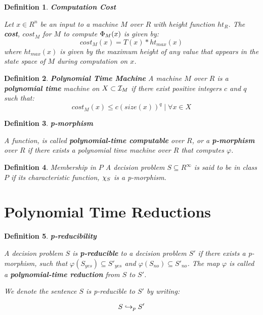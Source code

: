 \documentclass[twoside]{article}
\newtheorem{definition}{Definition}[section]
\begin{document}
\begin{definition}{\textbf{Computation Cost}}
  
  Let $x \in R^n$ be an input to a machine $M$ over $R$ with height
  function $ht_R$. The \textbf{cost}, $cost_M$ for $M$ to
  compute $\Phi_M(x)$ is given by:
  $$cost_M(x) = T(x) * ht_{max}(x)$$ where $ht_{max}(x)$ is given by the maximum
  height of any value that appears in the state space of $M$ during
  computation on $x$.
  
\end{definition}

\begin{definition}{\textbf{Polynomial Time Machine}}
  A machine $M$ over $R$ is a \textbf{polynomial time} machine on $X
  \subset \mathcal{I}_M$ if there exist positive integers $c$ and $q$
  such that:
  $$cost_M(x) \leq c(size(x))^q \mid \forall x \in X$$
\end{definition}

\begin{definition}{\textbf{p-morphism}}
  
  A function,  is called
  \textbf{polynomial-time computable} over $R$, or a
  \textbf{p-morphism} over $R$ if there exists a polynomial time
  machine over $R$ that computes $\varphi$.

\end{definition}

\begin{definition}{Membership in $P$}
  A decision problem $S \subseteq R^\infty$ is said to be in class $P$
  if its characteristic function, $\chi_S$ is a p-morphism.
\end{definition}

\section{Polynomial Time Reductions}

\begin{definition}{\textbf{p-reducibility}}

  A decision problem $S$ is \textbf{p-reducible} to a decision problem
  $S'$ if there exists a p-morphism,
   such that $\varphi(S_{yes})
  \subseteq S'_{yes}$ and $\varphi(S_{no}) \subseteq S'_{no}$.  The
  map $\varphi$ is called a \textbf{polynomial-time reduction} from
  $S$ to $S'$.

  We denote the sentence $S$ is p-reducible to $S'$ by writing:

  $$S \hookrightarrow_p S'$$
  \end{definition}
\end{document}
